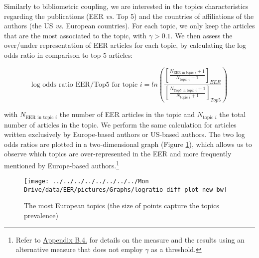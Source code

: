 \documentclass[
  12pt,
  onecolumn]{article}
\begin{document}
Similarly to bibliometric coupling, we are interested in the topics
characteristics regarding the publications (EER \emph{vs.} Top 5) and
the countries of affiliations of the authors (the US \emph{vs.} European
countries). For each topic, we only keep the articles that are the most
associated to the topic, with \(\gamma > 0.1\). We then assess the
over/under representation of EER articles for each topic, by calculating
the log odds ratio in comparison to top 5 articles:

\[
\text{log odds ratio EER/Top5 for topic }i = ln(\frac{[\frac{N_{\text{EER in topic }i}+1}{N_{\text{topic }i} + 1}]_{EER}}{[\frac{N_{\text{Top5 in topic }i}+1}{N_{\text{topic }i} + 1}]_{Top5}})
\]

with \(N_{\text{EER in topic }i}\) the number of EER articles in the
topic and \(N_{\text{topic }i}\) the total number of articles in the
topic. We perform the same calculation for articles written exclusively
by Europe-based authors or US-based authors. The two log odds ratios are
plotted in a two-dimensional graph (Figure \ref{fig:plot-topic-diff}),
which allows us to observe which topics are over-represented in the EER
and more frequently mentioned by Europe-based authors.\footnote{Refer to
  \protect\hyperlink{topic}{Appendix B.4.} for details on the measure
  and the results using an alternative measure that does not employ
  \(\gamma\) as a threshold.}

\begin{figure}[h]

{\centering \texttt{[image: ../../../../../../../../Mon Drive/data/EER/pictures/Graphs/logratio\_diff\_plot\_new\_bw]} 

}

\caption{The most European topics (the size of points capture the topics prevalence)}\label{fig:plot-topic-diff}
\end{figure}

\bigskip
\end{document}
